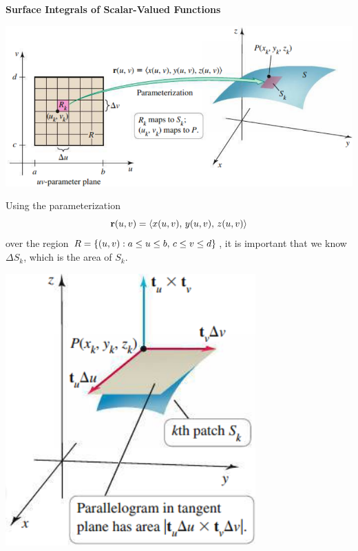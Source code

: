 \documentclass[mathNotesPreamble]{subfiles}
\begin{document}
  \noindent
  \textbf{Surface Integrals  of Scalar-Valued Functions}

  \begin{center}
    \includegraphics[width=0.8\linewidth]{images/briggs_17_06/fig17_47}
  \end{center}
  Using the parameterization 
    \[{\mathbf{r}}(u,v)={\left\langle x(u,v),\, y(u,v),\,z(u,v) \right\rangle}\]
  over the region $R={\left\{(u,v): a\leq u\leq b,\, c\leq v\leq d\right\}}$, it is important that we know $\Delta S_k$, which is the area of $S_k$.
  \begin{center}
    \includegraphics[width=0.35\linewidth]{images/briggs_17_06/fig17_48}
  \end{center}
  \pagebreak
\end{document}
